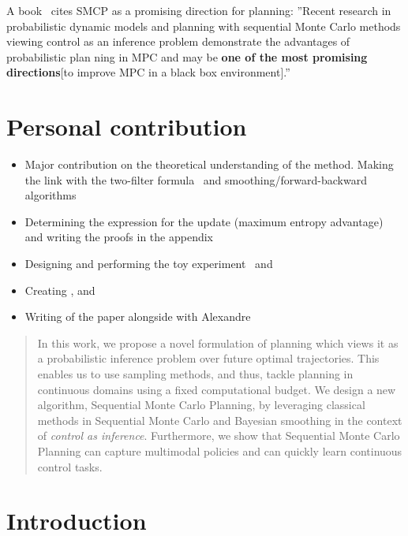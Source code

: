A book~\citep{belousov2021reinforcement} cites SMCP as a promising direction for planning: ''Recent research in probabilistic dynamic models and planning
with sequential Monte Carlo methods viewing control as an inference problem demonstrate the advantages of probabilistic plan
ning in MPC and may be \textbf{one of the most promising directions}[to improve MPC in a black box environment].''


\section*{Personal contribution}
\begin{itemize}
    \item Major contribution on the theoretical understanding of the method.
        Making the link with the two-filter formula~\citep{bresler1986two} and smoothing/forward-backward algorithms
    \item Determining the expression for the update (maximum entropy advantage)
        and writing the proofs in the appendix
    \item Designing and performing the toy experiment~ and 
    \item Creating ,  and 
    \item Writing of the paper alongside with Alexandre
\end{itemize}

\newpage
\begin{abstract}
In this work, we propose a novel formulation of planning which views it as a probabilistic inference problem over future optimal trajectories. This enables us to use sampling methods, and thus, tackle planning in continuous %
domains using a fixed computational budget.  We design a new algorithm, Sequential Monte Carlo Planning, by leveraging classical methods in Sequential Monte Carlo and Bayesian smoothing in the context of \textit{control as inference}.  %
Furthermore, we show that Sequential Monte Carlo Planning can capture multimodal policies and can quickly learn continuous control tasks. %
\end{abstract}

\section{Introduction}

